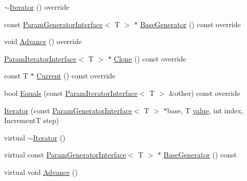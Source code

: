 \begin{DoxyCompactItemize}
\item 
\mbox{\hyperlink{classtesting_1_1internal_1_1_range_generator_1_1_iterator_a09f0f9f1d40f7a3d04e4e82f7274b2ab}{$\sim$\+Iterator}} () override
\item 
const \mbox{\hyperlink{classtesting_1_1internal_1_1_param_generator_interface}{Param\+Generator\+Interface}}$<$ T $>$ $\ast$ \mbox{\hyperlink{classtesting_1_1internal_1_1_range_generator_1_1_iterator_aa1dc4151e1eed1c546059ecb4f72440b}{Base\+Generator}} () const override
\item 
void \mbox{\hyperlink{classtesting_1_1internal_1_1_range_generator_1_1_iterator_ad17bd99e352c43b8ab654a4ad479d06e}{Advance}} () override
\item 
\mbox{\hyperlink{classtesting_1_1internal_1_1_param_iterator_interface}{Param\+Iterator\+Interface}}$<$ T $>$ $\ast$ \mbox{\hyperlink{classtesting_1_1internal_1_1_range_generator_1_1_iterator_a61a764294b66272d730f5ff5e0acdcf4}{Clone}} () const override
\item 
const T $\ast$ \mbox{\hyperlink{classtesting_1_1internal_1_1_range_generator_1_1_iterator_acbdfc5919d37fb9514914afb041e50ff}{Current}} () const override
\item 
bool \mbox{\hyperlink{classtesting_1_1internal_1_1_range_generator_1_1_iterator_a534406abbddb137d7672c2b53d5bff0b}{Equals}} (const \mbox{\hyperlink{classtesting_1_1internal_1_1_param_iterator_interface}{Param\+Iterator\+Interface}}$<$ T $>$ \&other) const override
\item 
\mbox{\hyperlink{classtesting_1_1internal_1_1_range_generator_1_1_iterator_a960184d2ea0ff223d9cf4d6ab015baa8}{Iterator}} (const \mbox{\hyperlink{classtesting_1_1internal_1_1_param_generator_interface}{Param\+Generator\+Interface}}$<$ T $>$ $\ast$base, T \mbox{\hyperlink{_obj__test_2lib_2googletest-master_2googlemock_2test_2gmock-matchers__test_8cc_a337b8a670efc0b086ad3af163f3121b6}{value}}, int index, IncrementT step)
\item 
virtual \mbox{\hyperlink{classtesting_1_1internal_1_1_range_generator_1_1_iterator_ab1da9a65a5b33c33b20354ea432ecf31}{$\sim$\+Iterator}} ()
\item 
virtual const \mbox{\hyperlink{classtesting_1_1internal_1_1_param_generator_interface}{Param\+Generator\+Interface}}$<$ T $>$ $\ast$ \mbox{\hyperlink{classtesting_1_1internal_1_1_range_generator_1_1_iterator_a353a987e94e585294c22b76ad8b461a3}{Base\+Generator}} () const
\item 
virtual void \mbox{\hyperlink{classtesting_1_1internal_1_1_range_generator_1_1_iterator_a4a97adf3eafecc62a83dfb7cad1b27f0}{Advance}} ()

\end{DoxyCompactItemize}
